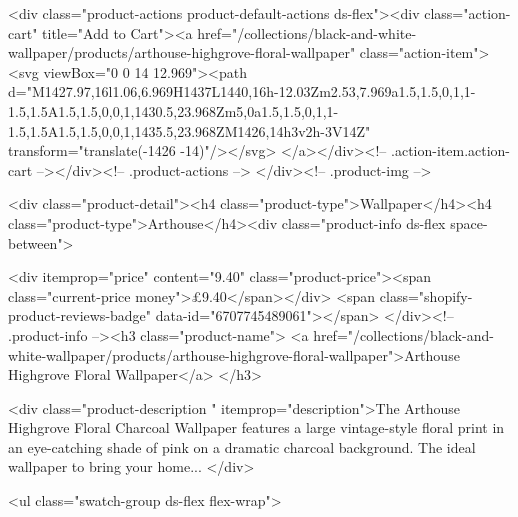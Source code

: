 {{{{{{{<div class="product-actions product-default-actions ds-flex"><div class="action-cart" title="Add to Cart"><a href="/collections/black-and-white-wallpaper/products/arthouse-highgrove-floral-wallpaper" class="action-item"><svg viewBox="0 0 14 12.969"><path d="M1427.97,16l1.06,6.969H1437L1440,16h-12.03Zm2.53,7.969a1.5,1.5,0,1,1-1.5,1.5A1.5,1.5,0,0,1,1430.5,23.968Zm5,0a1.5,1.5,0,1,1-1.5,1.5A1.5,1.5,0,0,1,1435.5,23.968ZM1426,14h3v2h-3V14Z" transform="translate(-1426 -14)"/></svg>
</a></div><!-- .action-item.action-cart --></div><!-- .product-actions -->
</div><!-- .product-img -->

<div class="product-detail"><h4 class="product-type">Wallpaper</h4><h4 class="product-type">Arthouse</h4><div class="product-info ds-flex space-between">
    
<div itemprop="price" content="9.40" class="product-price"><span class="current-price money">£9.40</span></div>
    <span class="shopify-product-reviews-badge" data-id="6707745489061"></span>
  </div><!-- .product-info --><h3 class="product-name">
      <a href="/collections/black-and-white-wallpaper/products/arthouse-highgrove-floral-wallpaper">Arthouse Highgrove Floral Wallpaper</a>
    </h3>
    
<div class="product-description " itemprop="description">The Arthouse Highgrove Floral Charcoal Wallpaper features a large vintage-style floral print in an eye-catching shade of pink on a dramatic charcoal background. The ideal wallpaper to bring your home...
</div>



<ul class="swatch-group ds-flex flex-wrap">
        
}}}}}}}
